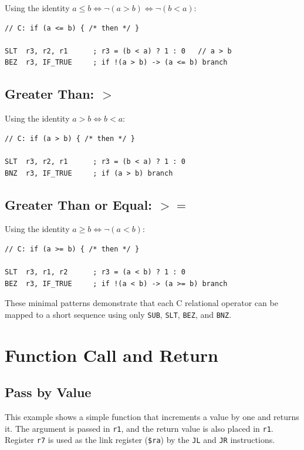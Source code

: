 \documentclass[12pt]{report}
\begin{document}
Using the identity $a \le b \Leftrightarrow \neg (a > b) \Leftrightarrow \neg (b < a)$:

\begin{lstlisting}
// C: if (a <= b) { /* then */ }

SLT  r3, r2, r1      ; r3 = (b < a) ? 1 : 0   // a > b
BEZ  r3, IF_TRUE     ; if !(a > b) -> (a <= b) branch
\end{lstlisting}

\subsection*{Greater Than: \texorpdfstring{$>$}{>}}

Using the identity $a > b \Leftrightarrow b < a$:

\begin{lstlisting}
// C: if (a > b) { /* then */ }

SLT  r3, r2, r1      ; r3 = (b < a) ? 1 : 0
BNZ  r3, IF_TRUE     ; if (a > b) branch
\end{lstlisting}

\subsection*{Greater Than or Equal: \texorpdfstring{$>=$}{>=}}

Using the identity $a \ge b \Leftrightarrow \neg (a < b)$:

\begin{lstlisting}
// C: if (a >= b) { /* then */ }

SLT  r3, r1, r2      ; r3 = (a < b) ? 1 : 0
BEZ  r3, IF_TRUE     ; if !(a < b) -> (a >= b) branch
\end{lstlisting}

\noindent
These minimal patterns demonstrate that each C relational operator can be mapped to a short sequence using only \texttt{SUB}, \texttt{SLT}, \texttt{BEZ}, and \texttt{BNZ}.

\section{Function Call and Return}

\subsection{Pass by Value}

This example shows a simple function that increments a value by one and returns it. The argument is passed in \texttt{r1}, and the return value is also placed in \texttt{r1}. Register \texttt{r7} is used as the link register (\texttt{\$ra}) by the \texttt{JL} and \texttt{JR} instructions.
\end{document}
